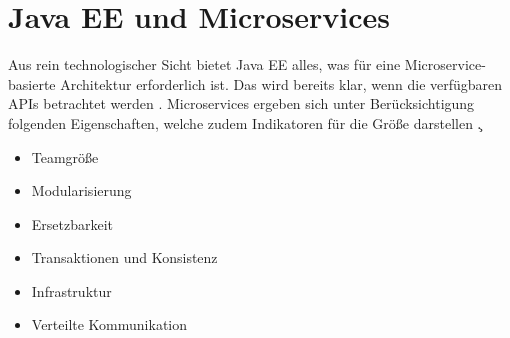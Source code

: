 \section{Java EE und Microservices}
Aus rein technologischer Sicht bietet Java EE alles, was für eine Microservice-basierte Architektur erforderlich ist. Das wird bereits klar, wenn die verfügbaren APIs betrachtet werden \cite{jaxcenter.2016}. Microservices ergeben sich unter Berücksichtigung folgenden Eigenschaften, welche zudem Indikatoren für die Größe darstellen \c.
\begin{itemize}
	\item Teamgröße
	\item Modularisierung
	\item Ersetzbarkeit
	\item Transaktionen und Konsistenz
	\item Infrastruktur
	\item Verteilte Kommunikation	
\end{itemize}

